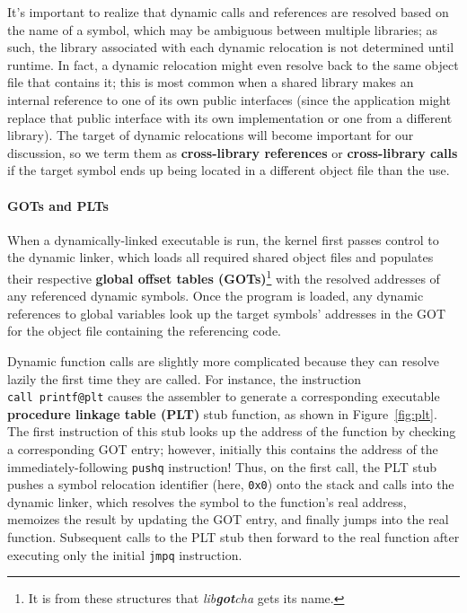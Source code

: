 It's important to realize that dynamic calls and references are resolved based on
the name of a symbol, which may be ambiguous between multiple libraries; as such, the
library associated with each dynamic relocation is not determined until runtime.
In fact, a dynamic relocation might even resolve back to the same object file that
contains it; this is most common when a shared library makes an internal reference to
one of its own public interfaces (since the application might replace that public
interface with its own implementation or one from a different library).  The target
of dynamic relocations will become important for our discussion, so we term them as
\textbf{cross-library references} or \textbf{cross-library calls} if the target
symbol ends up being located in a different object file than the use.

\paragraph{GOTs and PLTs}

When a dynamically-linked executable is run, the kernel first passes control to the
dynamic linker, which loads all required shared object files and populates their
respective \textbf{global offset tables (GOTs)}\footnote{It is from these structures
that \textit{lib\textbf{got}cha} gets its name.} with the resolved addresses of any
referenced dynamic symbols.  Once the program is loaded, any dynamic references to
global variables look up the target
symbols' addresses in the GOT for the object file containing the referencing code.

Dynamic function calls are slightly more complicated because they can resolve lazily
the first time they are called.  For instance, the instruction
\texttt{call~printf@plt} causes the assembler to generate a corresponding executable
\textbf{procedure linkage table (PLT)} stub function, as shown in
Figure~\ref{fig:plt}.  The first instruction of this stub looks up the address of the
function by checking a corresponding GOT entry; however, initially this contains the
address of the immediately-following \texttt{pushq} instruction!  Thus, on the first
call, the PLT stub pushes a symbol relocation identifier (here, \texttt{0x0}) onto
the stack and calls into the dynamic linker, which resolves the symbol to the
function's real address, memoizes the result by updating the GOT entry, and finally
jumps into the real function.  Subsequent calls to the PLT stub then forward to the
real function after executing only the initial \texttt{jmpq} instruction.

